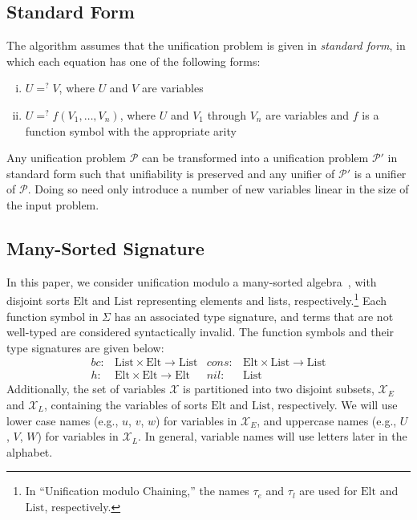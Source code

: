 \documentclass[11pt]{article}
\newcommand{\ueq}{=_{}^?}
\newcommand{\X}{\mathcal{X}}
\newcommand{\p}{\mathcal{P}}
\newcommand{\Elt}{\mathrm{Elt}}
\newcommand{\List}{\mathrm{List}}
\newcommand{\Bc}{\mathit{bc}}
\newcommand{\Hh}{\mathit{h}}
\newcommand{\Cons}{\mathit{cons}}
\newcommand{\Nil}{\mathit{nil}}
\begin{document}
\subsection{Standard Form}\label{subsection:standard-form}

The algorithm assumes that the unification problem is given in \emph{standard
form}, in which each equation has one of the following forms:
\begin{enumerate}[(i)]
    \item $U \ueq V$, where $U$ and $V$ are variables
    \item $U \ueq f(V_1, \dotsc, V_n)$, where $U$ and $V_1$ through $V_n$ are
        variables and $f$ is a function symbol with the appropriate arity
\end{enumerate}
Any unification problem $\p$ can be transformed into a unification problem
$\p'$ in standard form such that unifiability is preserved and any unifier of
$\p'$ is a unifier of $\p$. Doing so need only introduce a number of new variables
linear in the size of the input problem.

\subsection{Many-Sorted Signature}\label{subsection:signature}

In this paper, we consider unification modulo a many-sorted
algebra~\cite{walther1988many, kirchner1988order}, with disjoint sorts $\Elt$
and $\List$ representing elements and lists, respectively.\footnote{In
``Unification modulo Chaining,'' the names $\tau_e$ and $\tau_l$ are used for
$\Elt$ and $\List$, respectively.} Each function symbol in $\Sigma$ has an
associated type signature, and terms that are not well-typed are considered
syntactically invalid. The function symbols and their type signatures are given
below:
\begin{align*}
    \Bc \colon &\List \times \Elt \to \List &
    \Cons \colon &\Elt \times \List \to \List \\
    \Hh \colon &\Elt \times \Elt \to \Elt &
    \Nil \colon &\List
\end{align*}
Additionally, the set of variables $\X$ is partitioned into two disjoint subsets,
$\X_E$ and $\X_L$, containing the variables of sorts $\Elt$ and $\List$, respectively.
We will use lower case names (e.g., $u$, $v$, $w$) for variables in $\X_E$, and
uppercase names (e.g., $U$, $V$, $W$) for variables in $\X_L$. In general, variable
names will use letters later in the alphabet.
\end{document}
